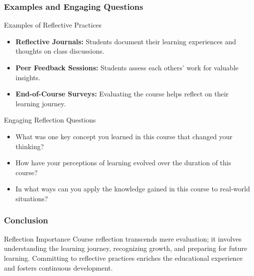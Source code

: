 \documentclass[aspectratio=169]{beamer}
\begin{document}
\begin{frame}[fragile]
    \frametitle{Examples and Engaging Questions}
    \begin{block}{Examples of Reflective Practices}
        \begin{itemize}
            \item \textbf{Reflective Journals:} Students document their learning experiences and thoughts on class discussions.
            \item \textbf{Peer Feedback Sessions:} Students assess each others' work for valuable insights.
            \item \textbf{End-of-Course Surveys:} Evaluating the course helps reflect on their learning journey.
        \end{itemize}
    \end{block}

    \begin{block}{Engaging Reflection Questions}
        \begin{itemize}
            \item What was one key concept you learned in this course that changed your thinking?
            \item How have your perceptions of learning evolved over the duration of this course?
            \item In what ways can you apply the knowledge gained in this course to real-world situations?
        \end{itemize}
    \end{block}
\end{frame}

\begin{frame}[fragile]
    \frametitle{Conclusion}
    \begin{block}{Reflection Importance}
        Course reflection transcends mere evaluation; it involves understanding the learning journey, recognizing growth, and preparing for future learning. Committing to reflective practices enriches the educational experience and fosters continuous development.
    \end{block}
\end{frame}
\end{document}
